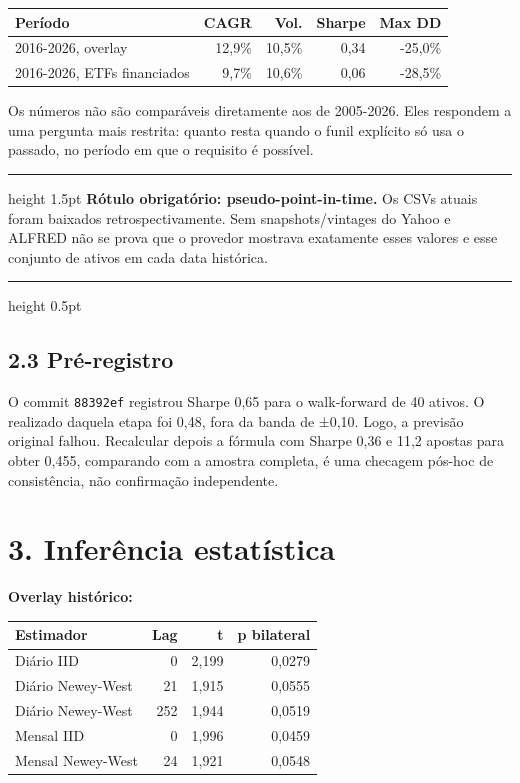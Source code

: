 \documentclass[10pt,a4paper]{article}
\newenvironment{callout}{\begin{center}\begin{minipage}{0.95\linewidth}\color{navy}\hrule height 1.5pt\vspace{2mm}\color{black}}{\vspace{1mm}\color{navy}\hrule height 0.5pt\end{minipage}\end{center}}
\begin{document}
\begin{tabularx}{\textwidth}{Xrrrr}
\toprule
Período & CAGR & Vol. & Sharpe & Max DD\\
\midrule
2016-2026, overlay & 12,9\% & 10,5\% & 0,34 & -25,0\%\\
2016-2026, ETFs financiados & 9,7\% & 10,6\% & 0,06 & -28,5\%\\
\bottomrule
\end{tabularx}

Os números não são comparáveis diretamente aos de 2005-2026. Eles respondem a
uma pergunta mais restrita: quanto resta quando o funil explícito só usa o
passado, no período em que o requisito é possível.

\begin{callout}
\textbf{Rótulo obrigatório: pseudo-point-in-time.} Os CSVs atuais foram
baixados retrospectivamente. Sem snapshots/vintages do Yahoo e ALFRED não se
prova que o provedor mostrava exatamente esses valores e esse conjunto de ativos
em cada data histórica.
\end{callout}

\subsection*{2.3 Pré-registro}
O commit \texttt{88392ef} registrou Sharpe 0,65 para o walk-forward de 40 ativos.
O realizado daquela etapa foi 0,48, fora da banda de ±0,10. Logo, a previsão
original falhou. Recalcular depois a fórmula com Sharpe 0,36 e 11,2 apostas para
obter 0,455, comparando com a amostra completa, é uma checagem pós-hoc de
consistência, não confirmação independente.

\section*{3. Inferência estatística}
\textbf{Overlay histórico:}\par\smallskip
\begin{tabularx}{\textwidth}{Xrrr}
\toprule
Estimador & Lag & t & p bilateral\\
\midrule
Diário IID & 0 & 2,199 & 0,0279\\
Diário Newey-West & 21 & 1,915 & 0,0555\\
Diário Newey-West & 252 & 1,944 & 0,0519\\
Mensal IID & 0 & 1,996 & 0,0459\\
Mensal Newey-West & 24 & 1,921 & 0,0548\\
\bottomrule
\end{tabularx}
\end{document}
